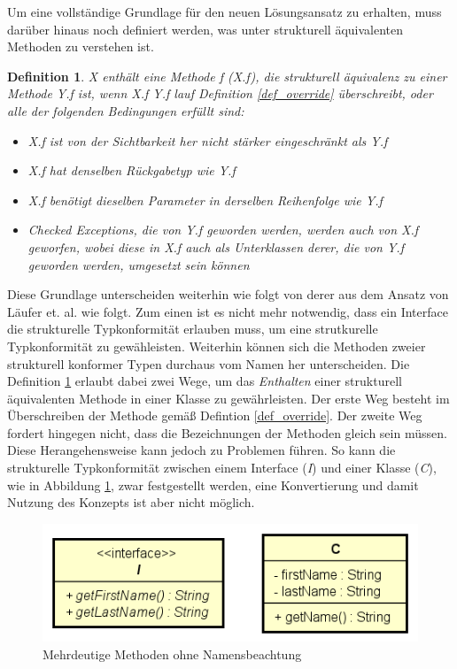 \documentclass[11pt, 
ngerman,
doublespacing,
chapterinoneline, %
consistentlayout, %
]{scrartcl}
\newtheorem{definition}{Definition}
\begin{document}
Um eine vollständige Grundlage für den neuen Lösungsansatz zu erhalten, muss darüber hinaus noch definiert werden, was unter strukturell äquivalenten Methoden zu verstehen ist.
\begin{definition}\label{def_containMethod_V1}
\emph{X} enthält eine Methode \emph{f} (\emph{X.f)}, die strukturell äquivalenz zu einer Methode \emph{Y.f} ist, wenn \emph{X.f} \emph{Y.f} lauf Definition \ref{def_override} überschreibt, oder alle der folgenden Bedingungen erfüllt sind:
\begin{itemize}
\item \emph{X.f} ist von der Sichtbarkeit her nicht stärker eingeschränkt als \emph{Y.f}
\item \emph{X.f} hat denselben Rückgabetyp wie \emph{Y.f}
\item \emph{X.f} benötigt dieselben Parameter in derselben Reihenfolge wie \emph{Y.f}
\item Checked Exceptions, die von \emph{Y.f} geworden werden, werden auch von \emph{X.f} geworfen, wobei diese in \emph{X.f} auch als Unterklassen derer, die von \emph{Y.f} geworden werden, umgesetzt sein können
\end{itemize} 
\end{definition}
Diese Grundlage unterscheiden weiterhin wie folgt von derer aus dem Ansatz von Läufer et. al. \cite{structconfjava} wie folgt. Zum einen ist es nicht mehr notwendig, dass ein Interface die strukturelle Typkonformität erlauben muss, um eine strutkurelle Typkonformität zu gewähleisten. Weiterhin können sich die Methoden zweier strukturell konformer Typen durchaus vom Namen her unterscheiden. Die Definition \ref{def_containMethod_V1} erlaubt dabei zwei Wege, um das \emph{Enthalten} einer strukturell äquivalenten Methode in einer Klasse zu gewährleisten. Der erste Weg besteht im Überschreiben der Methode gemäß Defintion \ref{def_override}. Der zweite Weg fordert hingegen nicht, dass die Bezeichnungen der Methoden gleich sein müssen. Diese Herangehensweise kann jedoch zu Problemen führen. So kann die strukturelle Typkonformität zwischen einem Interface (\emph{I}) und einer Klasse (\emph{C}), wie in Abbildung \ref{ambigousStructMethods}, zwar festgestellt werden, eine Konvertierung und damit Nutzung des Konzepts ist aber nicht möglich. 
\begin{figure}[h]
\centering
\includegraphics[scale=0.5]{pics/ambigousMethods.png}
\caption{Mehrdeutige Methoden ohne Namensbeachtung}
\label{ambigousStructMethods}
\end{figure} 
\end{document}
